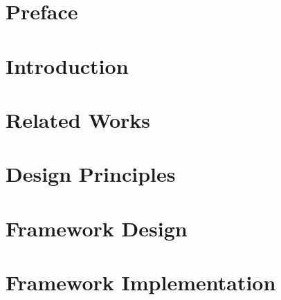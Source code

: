 





\chapter*{Preface}



\tableofcontents

\chapter{Introduction}






\chapter{Related Works}









\chapter{Design Principles}




\chapter{Framework Design} \label{cha:design}





\chapter{Framework Implementation} \label{cha:frameworkImplementation}











